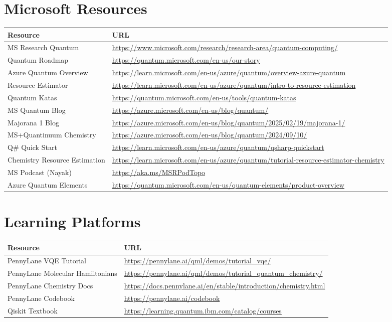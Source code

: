 \documentclass[11pt,a4paper]{article}
\begin{document}
\section*{Microsoft Resources}
\begin{longtable}{p{6cm}p{9cm}}
\toprule
\textbf{Resource} & \textbf{URL} \\
\midrule
MS Research Quantum & \url{https://www.microsoft.com/research/research-area/quantum-computing/} \\
Quantum Roadmap & \url{https://quantum.microsoft.com/en-us/our-story} \\
Azure Quantum Overview & \url{https://learn.microsoft.com/en-us/azure/quantum/overview-azure-quantum} \\
Resource Estimator & \url{https://learn.microsoft.com/en-us/azure/quantum/intro-to-resource-estimation} \\
Quantum Katas & \url{https://quantum.microsoft.com/en-us/tools/quantum-katas} \\
MS Quantum Blog & \url{https://azure.microsoft.com/en-us/blog/quantum/} \\
Majorana 1 Blog & \url{https://azure.microsoft.com/en-us/blog/quantum/2025/02/19/majorana-1/} \\
MS+Quantinuum Chemistry & \url{https://azure.microsoft.com/en-us/blog/quantum/2024/09/10/} \\
Q\# Quick Start & \url{https://learn.microsoft.com/en-us/azure/quantum/qsharp-quickstart} \\
Chemistry Resource Estimation & \url{https://learn.microsoft.com/en-us/azure/quantum/tutorial-resource-estimator-chemistry} \\
MS Podcast (Nayak) & \url{https://aka.ms/MSRPodTopo} \\
Azure Quantum Elements & \url{https://quantum.microsoft.com/en-us/quantum-elements/product-overview} \\
\bottomrule
\end{longtable}

\section*{Learning Platforms}
\begin{longtable}{p{6cm}p{9cm}}
\toprule
\textbf{Resource} & \textbf{URL} \\
\midrule
PennyLane VQE Tutorial & \url{https://pennylane.ai/qml/demos/tutorial_vqe/} \\
PennyLane Molecular Hamiltonians & \url{https://pennylane.ai/qml/demos/tutorial_quantum_chemistry/} \\
PennyLane Chemistry Docs & \url{https://docs.pennylane.ai/en/stable/introduction/chemistry.html} \\
PennyLane Codebook & \url{https://pennylane.ai/codebook} \\
Qiskit Textbook & \url{https://learning.quantum.ibm.com/catalog/courses} \\
\bottomrule
\end{longtable}
\end{document}
